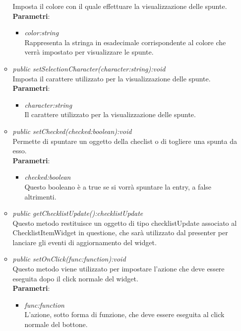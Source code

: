 \begin{itemize}
\begin{itemize}
	Imposta il colore con il quale effettuare la visualizzazione delle spunte.
		\\ \textbf{Parametri}: \begin{itemize}
		\item \textit{color:string}\\
		Rappresenta la stringa in esadecimale corrispondente al colore che verrà impostato per visualizzare le spunte.
		\end{itemize}  
	\item \textit{public setSelectionCharacter(character:string):void}\\
	Imposta il carattere utilizzato per la visualizzazione delle spunte.
		\\ \textbf{Parametri}: \begin{itemize}
		\item \textit{character:string}\\
		Il carattere utilizzato per la visualizzazione delle spunte.
		\end{itemize} 
	\item \textit{public setChecked(checked:boolean):void}\\
	Permette di spuntare un oggetto della checlist o di togliere una spunta da esso.
		\\ \textbf{Parametri}: \begin{itemize}
		\item \textit{checked:boolean}\\
		Questo booleano è a true se si vorrà spuntare la entry, a false altrimenti.
		\end{itemize}  
	\item \textit{public getChecklistUpdate():checklistUpdate}\\
	Questo metodo restituisce un oggetto di tipo checklistUpdate associato al ChecklistItemWidget in questione, che sarà utilizzato dal presenter per lanciare gli eventi di aggiornamento del widget.
	\item \textit{public setOnClick(func:function):void}\\
	Questo metodo viene utilizzato per impostare l'azione che deve essere eseguita dopo il click normale del widget.
		\\ \textbf{Parametri}: \begin{itemize}
		\item \textit{func:function}\\
		L'azione, sotto forma di funzione, che deve essere eseguita al click normale del bottone.
		\end{itemize}

\end{itemize}
\end{itemize}
